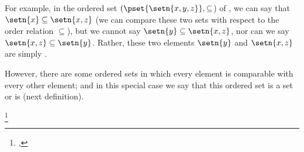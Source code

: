 For example, in the ordered set $(\pset{\setn{x,y,z}},\subseteq$)
of ,
we can say that $\setn{x}\subseteq\setn{x,z}$ (we can compare these two sets
with respect to the order relation $\subseteq$),
but we cannot say $\setn{y}\subseteq\setn{x,z}$, nor can we say
$\setn{x,z}\subseteq\setn{y}$.
Rather, these two elements $\setn{y}$ and $\setn{x,z}$ are simply .

However, there are some ordered sets 
in which every element is comparable with every other element;
and in this special case we say that this ordered set is a 
 set or is  (next definition).

\begin{definition}
\footnote{
  ,
  }
\label{def:toset}
\label{def:chain}
\end{definition}

